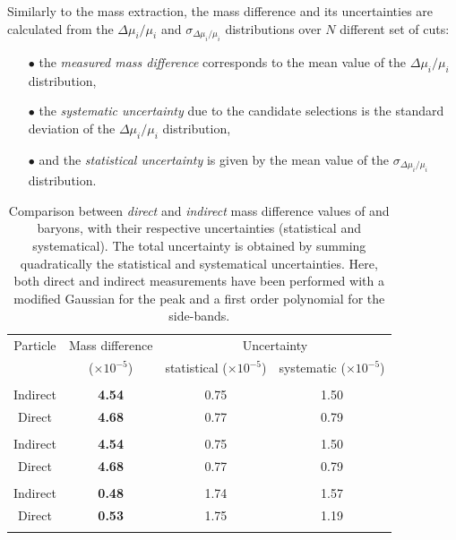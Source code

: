Similarly to the mass extraction, the mass difference and its uncertainties are calculated from the $\Delta \mu_{i}/  \mu_{i}$ and $\sigma_{\Delta \mu_{i} /\mu_{i} }$ distributions over $N$ different set of cuts:
\begin{itemize}
\item[$\bullet$] the \textit{measured mass difference} corresponds to the mean value of the $\Delta \mu_{i}/  \mu_{i}$ distribution,
\item[$\bullet$] the \textit{systematic uncertainty} due to the candidate selections is the standard deviation of the $\Delta \mu_{i}/  \mu_{i}$ distribution,
\item[$\bullet$] and the \textit{statistical uncertainty} is given by the mean value of the $\sigma_{\Delta \mu_{i} /\mu_{i} }$ distribution.
\end{itemize}

\begin{table}[t]
    \centering
    \begin{tabular}{cccc}
    \noalign{\smallskip}\hline \noalign{\smallskip}
    Particle & Mass difference & \multicolumn{2}{c}{Uncertainty}\\  
    & ($\times 10^{-5}$) & statistical ($\times 10^{-5}$) & systematic ($\times 10^{-5}$) \\
    \noalign{\smallskip}\hline \noalign{\smallskip}
    \multicolumn{4}{l}{\bf \rmLambda} \\
    Indirect & \bf 4.54 &  0.75 & 1.50 \\
    Direct & \bf 4.68 & 0.77 & 0.79 \\ 
    \noalign{\smallskip}\hline \noalign{\smallskip}
    \multicolumn{4}{l}{\bf \rmXi} \\
    Indirect & \bf 4.54 &  0.75 & 1.50 \\
    Direct & \bf 4.68 & 0.77 & 0.79 \\ 
    \noalign{\smallskip}\hline \noalign{\smallskip}
    \multicolumn{4}{l}{\bf \rmOmega} \\
    Indirect & \bf 0.48 & 1.74 & 1.57  \\
    Direct & \bf 0.53 & 1.75 & 1.19   \\
    \noalign{\smallskip}\hline \noalign{\smallskip}
    \end{tabular}
    \caption{Comparison between \textit{direct} and \textit{indirect} mass difference values of \rmXi and \rmOmega baryons, with their respective uncertainties (statistical and systematical). The total uncertainty is obtained by summing quadratically the statistical and systematical uncertainties. Here, both direct and indirect measurements have been performed with a modified Gaussian for the peak and a first order polynomial for the side-bands.}\label{tab:SystMassDifference}
\end{table}

